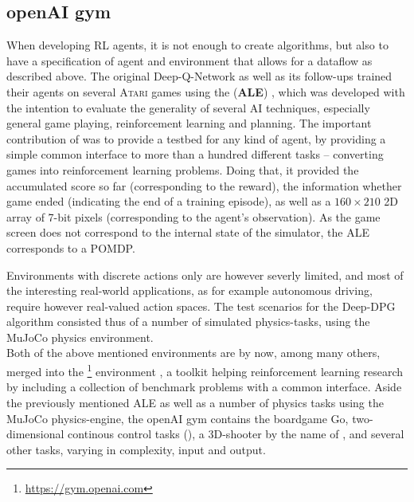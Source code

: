 \subsection{openAI gym}

When developing RL agents, it is not enough to create algorithms, but also to have a specification of agent and environment that allows for a dataflow as described above. The original Deep-Q-Network \cite{mnih_playing_2013} as well as its follow-ups \cite{van_hasselt_deep_2015}\cite{wang_dueling_2015} trained their agents on several \textsc{Atari} games using the  (\textbf{ALE}) \cite{bellemare_arcade_2012}, which was developed with the intention to evaluate the generality of several AI techniques, especially general game playing, reinforcement learning and planning. The important contribution of \cite{bellemare_arcade_2012} was to provide a testbed for any kind of agent, by providing a simple common interface to more than a hundred different tasks -- converting games into reinforcement learning problems. Doing that, it provided the accumulated score so far (corresponding to the reward), the information whether game ended (indicating the end of a training episode), as well as a $160 \times 210$  2D array of 7-bit pixels (corresponding to the agent's observation). As the game screen does not correspond to the internal state of the simulator, the ALE corresponds to a POMDP. 

Environments with discrete actions only are however severly limited, and most of the interesting real-world applications, as for example autonomous driving, require however real-valued action spaces. The test scenarios for the Deep-DPG algorithm consisted thus of a number of simulated physics-tasks, using the MuJoCo physics environment. \\

\noindent Both of the above mentioned environments are by now, among many others, merged into the \footnote{\url{https://gym.openai.com}} environment \cite{brockman_openai_2016}, a toolkit helping reinforcement learning research by including a collection of benchmark problems with a common interface. Aside the previously mentioned ALE as well as a number of physics tasks using the MuJoCo physics-engine, the openAI gym contains the boardgame Go, two-dimensional continous control tasks (), a 3D-shooter by the name of , and several other tasks, varying in complexity, input and output.

